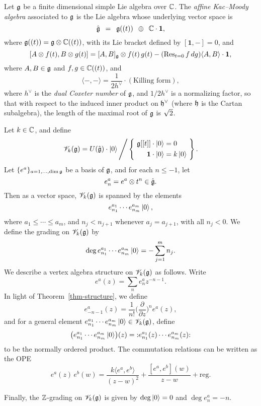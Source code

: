 \begin{example} 
    \label{eg-kac-moody}
    Let $\mathfrak{g}$ be a finite dimensional simple Lie algebra over $\mathbb{C}$.
    The \emph{affine Kac--Moody algebra} associated to $\mathfrak{g}$
    is the Lie algebra whose underlying vector space is
    \[
        \hat{\mathfrak{g}} \enspace = \enspace
        \mathfrak{g} ((t)) \enspace \oplus \enspace \mathbb{C} \cdot \mathbf{1},
    \]
    where $\mathfrak{g} ((t)) = \mathfrak{g} \otimes \mathbb{C} ((t))$,
    with its Lie bracket defined by $[\mathbf{1}, -] = 0$, and
    \[
        [A \otimes f (t), B \otimes g (t)] =
        [A, B]_{\mathfrak{g}} \otimes f (t) \, g (t) -
        (\operatorname{Res}_{t = 0} f \, d g) \langle A, B \rangle \cdot \mathbf{1},
    \]
    where $A, B \in \mathfrak{g}$ and $f, g \in \mathbb{C} ((t))$, and
    \[
        \langle -, - \rangle =
        \frac {1} {2 h^\vee} \cdot (\text{Killing form}),
    \]
    where $h^\vee$ is the \emph{dual Coxeter number} of $\mathfrak{g}$,
    and $1 / 2 h^\vee$ is a normalizing factor,
    so that with respect to the induced inner product on $\mathfrak{h}^\vee$
    (where $\mathfrak{h}$ is the Cartan subalgebra),
    the length of the maximal root of $\mathfrak{g}$ is ${\scriptstyle\sqrt{\textstyle2}}$.
    
    Let $k \in \mathbb{C}$, and define
    \[
        \scrV_k (\frg) =
        U (\hat{\frg}) \cdot \ket{0} \Bigg/
        \left\{ \ 
            \begin{aligned}
                \frg [[t]] \cdot \ket{0} &= 0 \\
                \mathbf{1} \cdot \ket{0} &= k \ket{0}
            \end{aligned}
        \ \right\}.
    \]
    Let $\{ e^a \}_{a = 1, \dotsc, \dim \mathfrak{g}}$ be a basis of $\mathfrak{g}$,
    and for each $n \leq -1$, let
    \[
        e^a_n = e^a \otimes t^n \in \hat{\mathfrak{g}}.
    \]
    Then as a vector space, $\mathscr{V}_k (\mathfrak{g})$ is spanned by the elements
    \[
        e^{a_1}_{n_1} \cdots e^{a_m}_{n_m} \mathinner{\mathopen{|}0\mathclose{\rangle}},
    \]
    where $a_1 \leq \cdots \leq a_m$,
    and $n_j < n_{j+1}$ whenever $a_j = a_{j+1}$,
    with all $n_j < 0$.
    We define the grading on $\mathscr{V}_k (\mathfrak{g})$ by
    \[
        \deg e^{a_1}_{n_1} \cdots e^{a_m}_{n_m} \mathinner{\mathopen{|}0\mathclose{\rangle}}
        = -\sum_{j=1}^m n_j.
    \]
    We describe a vertex algebra structure on $\mathscr{V}_k (\mathfrak{g})$ as follows.
    Write
    \[
        e^a (z) = \sum_{n} e^a_n z^{-n - 1}.
    \]
    In light of Theorem~\ref{thm-structure},
    we define
    \[
        e^a_{-n-1} (z) =
        \frac{1}{n!}
        \biggl( \frac {\partial} {\partial z} \biggr)^n e^a (z),
    \]
    and for a general element
    $e^{a_1}_{n_1} \cdots e^{a_m}_{n_m} \mathinner{\mathopen{|}0\mathclose{\rangle}} \in \mathscr{V}_k (\mathfrak{g})$,
    define
    \[
        \bigl( e^{a_1}_{n_1} \cdots e^{a_m}_{n_m} \mathinner{\mathopen{|}0\mathclose{\rangle}} \bigr) (z)
        = \mathopen{:} e^{a_1}_{n_1} (z) \cdots e^{a_m}_{n_m} (z) \mathclose{:}
    \]
    to be the normally ordered product.
    The commutation relations can be written as the OPE
    \[
        e^a (z) \, e^b (w) =
        \frac {k \langle e^a, e^b \rangle} {(z - w)^2} +
        \frac {[e^a, e^b] (w)} {z - w} + \text{reg.}
    \]
    
    Finally, the $\mathbb{Z}$-grading on $\mathscr{V}_k (\mathfrak{g})$
    is given by $\deg \mathinner{\mathopen{|}0\mathclose{\rangle}} = 0$ and $\deg e^a_n = -n$.
    \varqed
\end{example}


